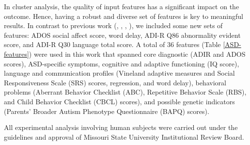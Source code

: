 \documentclass{bmcart}
\begin{document}
In cluster analysis, the quality of input features has a significant impact on the outcome. Hence, having a robust and diverse set of features is key to meaningful results. 
In contrast to previous work (\cite{obafemi2018asd}, \cite{BICOB}, \cite{al2016ensemble}, \cite{obafemi2015sorting}), we included some new sets of features: ADOS social affect score, word delay, ADI-R Q86 abnormality evident score, and ADI-R Q30 language total score. A total of 36 features (Table \ref{ASD-features}) were used in this work that spanned core diagnostic (ADIR and ADOS scores), ASD-specific symptoms, cognitive and adaptive functioning (IQ score), language and communication profiles (Vineland adaptive measures and Social Responsiveness Scale (SRS) scores, regression, and word delay), behavioral problems (Aberrant Behavior Checklist (ABC), Repetitive Behavior Scale (RBS), and Child Behavior Checklist (CBCL) scores), and possible genetic indicators (Parents’ Broader Autism Phenotype Questionnaire (BAPQ) scores). 

All experimental analysis involving human subjects were carried out under the guidelines and approval of Missouri State University Institutional Review Board.
\end{document}
